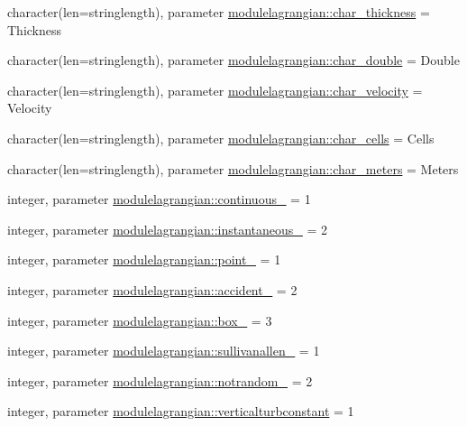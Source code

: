 \begin{DoxyCompactItemize}
\item 
character(len=stringlength), parameter \mbox{\hyperlink{namespacemodulelagrangian_a66367b7cd3bc7bbba76e7d5014c5e8b7}{modulelagrangian\+::char\+\_\+thickness}} = \textquotesingle{}Thickness\textquotesingle{}
\item 
character(len=stringlength), parameter \mbox{\hyperlink{namespacemodulelagrangian_a7412b23a2a18daab9938640e25a7831f}{modulelagrangian\+::char\+\_\+double}} = \textquotesingle{}Double\textquotesingle{}
\item 
character(len=stringlength), parameter \mbox{\hyperlink{namespacemodulelagrangian_a10a4e31355ba7ebe61afd98d0002f7f1}{modulelagrangian\+::char\+\_\+velocity}} = \textquotesingle{}Velocity\textquotesingle{}
\item 
character(len=stringlength), parameter \mbox{\hyperlink{namespacemodulelagrangian_ad01950a51ef2bd2bbee9c87b29c24f4c}{modulelagrangian\+::char\+\_\+cells}} = \textquotesingle{}Cells\textquotesingle{}
\item 
character(len=stringlength), parameter \mbox{\hyperlink{namespacemodulelagrangian_a2fc2ba05f8d15170ba6f5b8ee32e7f7a}{modulelagrangian\+::char\+\_\+meters}} = \textquotesingle{}Meters\textquotesingle{}
\item 
integer, parameter \mbox{\hyperlink{namespacemodulelagrangian_a583bc715e00f8966a9ae3058886ddfc0}{modulelagrangian\+::continuous\+\_\+}} = 1
\item 
integer, parameter \mbox{\hyperlink{namespacemodulelagrangian_a3f74c96cc313910c329f98ea1f8aab63}{modulelagrangian\+::instantaneous\+\_\+}} = 2
\item 
integer, parameter \mbox{\hyperlink{namespacemodulelagrangian_a4610ec4d0d22c861a9bd320cdc15492c}{modulelagrangian\+::point\+\_\+}} = 1
\item 
integer, parameter \mbox{\hyperlink{namespacemodulelagrangian_a46e68ebc0ee20eacf75641e0c1545a88}{modulelagrangian\+::accident\+\_\+}} = 2
\item 
integer, parameter \mbox{\hyperlink{namespacemodulelagrangian_af48cfae0591278eb3f18e766c8343ab6}{modulelagrangian\+::box\+\_\+}} = 3
\item 
integer, parameter \mbox{\hyperlink{namespacemodulelagrangian_a84cf4506e77e543c0b17298a49143acb}{modulelagrangian\+::sullivanallen\+\_\+}} = 1
\item 
integer, parameter \mbox{\hyperlink{namespacemodulelagrangian_a3eab7b0601830df30aaa45c992c1293e}{modulelagrangian\+::notrandom\+\_\+}} = 2
\item 
integer, parameter \mbox{\hyperlink{namespacemodulelagrangian_a46ba4ae7e2308c820cee20ab67fd4c51}{modulelagrangian\+::verticalturbconstant}} = 1

\end{DoxyCompactItemize}
